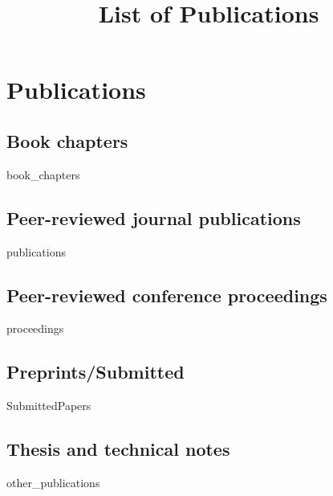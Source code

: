 \documentclass[12pt]{scrartcl}
\title{List of Publications}
\begin{document}
\maketitle
\nocite{*}


\section{Publications}
\subsection{Book chapters}
\begin{btSect}[unsrt]{book_chapters}
\btPrintAll
\end{btSect}

\subsection{\textbf{Peer-reviewed journal publications}}

\begin{btSect}{publications}
\btPrintAll
\end{btSect}

\subsection{\textbf{Peer-reviewed conference proceedings}}
\begin{btSect}[unsrt]{proceedings}
\btPrintAll
\end{btSect}


\subsection{\textbf{Preprints/Submitted}}
\begin{btSect}[unsrt]{SubmittedPapers}
\btPrintAll
\end{btSect}


\subsection{\textbf{Thesis and technical notes}}
\begin{btSect}[unsrt]{other_publications}
	\btPrintAll
\end{btSect}
\end{document}
